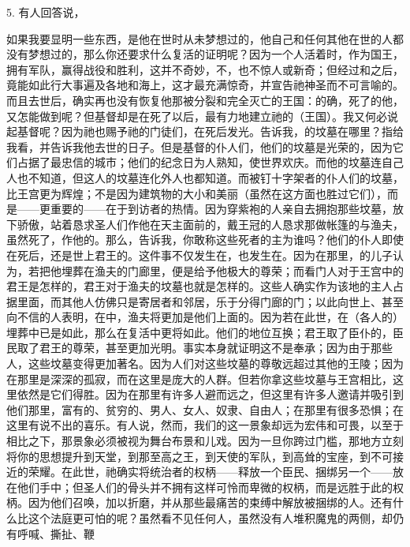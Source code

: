 5. 有人回答说，\par

如果我要显明一些东西，是他在世时从未梦想过的，他自己和任何其他在世的人都没有梦想过的，那么你还要求什么复活的证明呢？因为一个人活着时，作为国王，拥有军队，赢得战役和胜利，这并不奇妙，不，也不惊人或新奇；但经过和之后，竟能如此行大事遍及各地和海上，这才最充满惊奇，并宣告祂神圣而不可言喻的。而且去世后，确实再也没有恢复他那被分裂和完全灭亡的王国：的确，死了的他，又怎能做到呢？但基督却是在死了以后，最有力地建立祂的（王国）。我又何必说起基督呢？因为祂也赐予祂的门徒们，在死后发光。告诉我，的坟墓在哪里？指给我看，并告诉我他去世的日子。但是基督的仆人们，他们的坟墓是光荣的，因为它们占据了最忠信的城市；他们的纪念日为人熟知，使世界欢庆。而他的坟墓连自己人也不知道，但这人的坟墓连化外人也都知道。而被钉十字架者的仆人们的坟墓，比王宫更为辉煌；不是因为建筑物的大小和美丽（虽然在这方面也胜过它们），而是——更重要的——在于到访者的热情。因为穿紫袍的人亲自去拥抱那些坟墓，放下骄傲，站着恳求圣人们作他在天主面前的，戴王冠的人恳求那做帐篷的与渔夫，虽然死了，作他的。那么，告诉我，你敢称这些死者的主为谁吗？他们的仆人即使在死后，还是世上君王的。这件事不仅发生在，也发生在。因为在那里，的儿子认为，若把他埋葬在渔夫的门廊里，便是给予他极大的尊荣；而看门人对于王宫中的君王是怎样的，君王对于渔夫的坟墓也就是怎样的。这些人确实作为该地的主人占据里面，而其他人仿佛只是寄居者和邻居，乐于分得门廊的门；以此向世上、甚至向不信的人表明，在中，渔夫将更加是他们上面的。因为若在此世，在（各人的）埋葬中已是如此，那么在复活中更将如此。他们的地位互换；君王取了臣仆的，臣民取了君王的尊荣，甚至更加光明。事实本身就证明这不是奉承；因为由于那些人，这些坟墓变得更加著名。因为人们对这些坟墓的尊敬远超过其他的王陵；因为在那里是深深的孤寂，而在这里是庞大的人群。但若你拿这些坟墓与王宫相比，这里依然是它们得胜。因为在那里有许多人避而远之，但这里有许多人邀请并吸引到他们那里，富有的、贫穷的、男人、女人、奴隶、自由人；在那里有很多恐惧；在这里有说不出的喜乐。有人说，然而，我们的这一景象却远为宏伟和可畏，以至于相比之下，那景象必须被视为舞台布景和儿戏。因为一旦你跨过门槛，那地方立刻将你的思想提升到天堂，到那至高之王，到天使的军队，到高耸的宝座，到不可接近的荣耀。在此世，祂确实将统治者的权柄——释放一个臣民、捆绑另一个——放在他们手中；但圣人们的骨头并不拥有这样可怜而卑微的权柄，而是远胜于此的权柄。因为他们召唤，加以折磨，并从那些最痛苦的束缚中解放被捆绑的人。还有什么比这个法庭更可怕的呢？虽然看不见任何人，虽然没有人堆积魔鬼的两侧，却仍有呼喊、撕扯、鞭